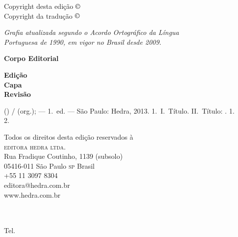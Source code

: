 
\begingroup
\parindent0mm\parskip0mm
\footnotesize
\thispagestyle{empty}

Copyright desta edição $\copyright$ \direitos\ \ano\\
Copyright da tradução $\copyright$ \escola\medskip

{\itshape
Grafia atualizada segundo o Acordo Ortográfico da Língua\\
Portuguesa de 1990, em vigor no Brasil desde 2009.
}\medskip

\textbf{Corpo Editorial}\smallskip

\textbf{Edição}\ \ \  \editor\\
\textbf{Capa}\ \ \  \capista\\
\textbf{Revisão}\ \ \ \revisor

%
{\titulo{} (\textit{\escola{}}) / \organizador{} (org.); --- 1.~ed. --- São Paulo: Hedra, 2013.}%
{\isbn}%
{1.~\ccdA I.~Título. II.~Título: \titulo{}.}%
{}%
{}%
{1.~\ccdA{}\\
2.~\ccdB{}}

Todos os direitos desta edição reservados à\\
\textsc{editora hedra ltda.}\\
Rua Fradique Coutinho, 1139 (subsolo)\\
05416-011 São Paulo \textsc{sp} Brasil\\
+55 11 3097 8304\\
editora@hedra.com.br\\
www.hedra.com.br
\bigskip

\textsc{\escola}\\
\escolaendereco{}\\
Tel.~\telefoneescola\\
\urlescola

\endgroup
\clearpage
